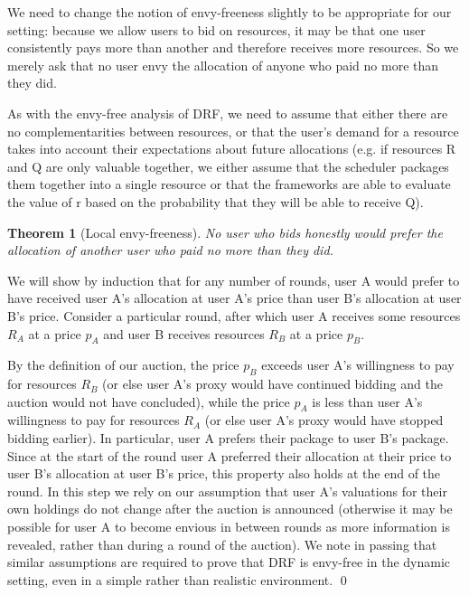 \documentclass{acm_proc_article-sp}
\newtheorem{theorem}{Theorem}[section]
\newenvironment{pproof}[1][Proof]{\begin{trivlist}
\item[\hskip \labelsep {\bfseries #1}]}{\end{trivlist}}
\begin{document}
We need to change the notion of envy-freeness slightly to be appropriate for our setting: 
because we allow users to bid on resources, it may be that one user consistently pays more than another and therefore receives more resources. 
So we merely ask that no user envy the allocation of anyone who paid no more than they did.

As with the envy-free analysis of DRF, we need to assume that either there are no complementarities between resources, or that the user's demand for a resource takes into account their expectations about future allocations (e.g. if resources R and Q are only valuable together, we either assume that the scheduler packages them together into a single resource or that the frameworks are able to evaluate the value of r based on the probability that they will be able to receive Q).
\vspace{-5mm}
\begin{theorem}[Local envy-freeness]
No user who bids honestly would prefer the allocation of another user who paid no more than they did.
\end{theorem}
\vspace{-5mm}
\begin{pproof}
We will show by induction that for any number of rounds, user A would prefer to have received user A's allocation at user A's price than user B's allocation at user B's price. Consider a particular round, after which user A receives some resources $R_A$ at a price $p_A$ and user B receives resources $R_B$ at a price $p_B$.

By the definition of our auction, the price $p_B$ exceeds user A's willingness to pay for resources $R_B$ 
(or else user A's proxy would have continued bidding and the auction would not have concluded), 
while the price $p_A$ is less than user A's willingness to pay for resources $R_A$ 
(or else user A's proxy would have stopped bidding earlier). 
In particular, user A prefers their package to user B's package. 
Since at the start of the round user A preferred their allocation at their price to user B's allocation at user B's price, 
this property also holds at the end of the round. 
In this step we rely on our assumption that user A's valuations for their own holdings do not change after the auction is announced 
(otherwise it may be possible for user A to become envious in between rounds as more information is revealed, rather than during a round of the auction). 
We note in passing that similar assumptions are required to prove that DRF is envy-free in the dynamic setting,
even in a simple rather than realistic environment.
\qed
\end{pproof}
\end{document}
